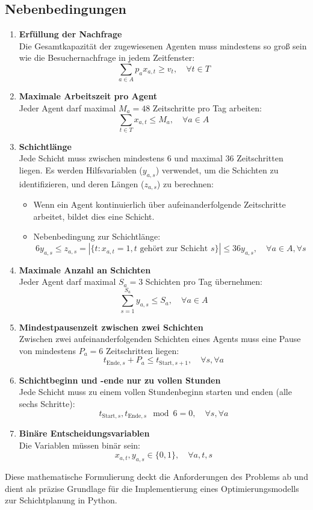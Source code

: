 \subsection*{Nebenbedingungen}
\begin{enumerate}
    \item \textbf{Erfüllung der Nachfrage}\\
          Die Gesamtkapazität der zugewiesenen Agenten muss mindestens so groß sein wie die Besuchernachfrage in jedem Zeitfenster:
          $$\sum_{a \in A} p_a x_{a,t} \geq v_t, \quad \forall t \in T$$
    \item \textbf{Maximale Arbeitszeit pro Agent}\\
          Jeder Agent darf maximal $M_a = 48$ Zeitschritte pro Tag arbeiten:
          $$\sum_{t \in T} x_{a,t} \leq M_a, \quad \forall a \in A$$
    \item \textbf{Schichtlänge}\\
          Jede Schicht muss zwischen mindestens 6 und maximal 36 Zeitschritten liegen. Es werden Hilfsvariablen ($y_{a,s}$) verwendet, um die Schichten zu identifizieren, und deren Längen ($z_{a,s}$) zu berechnen:
          \begin{itemize}
              \item Wenn ein Agent kontinuierlich über aufeinanderfolgende Zeitschritte arbeitet, bildet dies eine Schicht.
              \item Nebenbedingung zur Schichtlänge: $$6y_{a,s} \leq z_{a,s} = |\{t: x_{a,t}=1, t\text{ gehört zur Schicht }s\}| \leq 36y_{a,s},\quad\forall a\in A,\forall s$$
          \end{itemize}
    \item \textbf{Maximale Anzahl an Schichten}\\
          Jeder Agent darf maximal $S_a = 3$ Schichten pro Tag übernehmen:
          $$\sum_{s=1}^{S_a} y_{a,s} \leq S_a,\quad\forall a\in A$$
    \item \textbf{Mindestpausenzeit zwischen zwei Schichten}\\
          Zwischen zwei aufeinanderfolgenden Schichten eines Agents muss eine Pause von mindestens $P_a = 6$ Zeitschritten liegen:
          $$t_{\text{Ende},s} + P_a \leq t_{\text{Start},s+1},\quad\forall s,\forall a$$
    \item \textbf{Schichtbeginn und -ende nur zu vollen Stunden}\\
          Jede Schicht muss zu einem vollen Stundenbeginn starten und enden (alle sechs Schritte):
          $$t_{\text{Start},s}, t_{\text{Ende},s} \mod 6 = 0,\quad\forall s,\forall a$$
    \item \textbf{Binäre Entscheidungsvariablen}\\
          Die Variablen müssen binär sein:
          $$x_{a,t}, y_{a,s} \in \{0,1\},\quad\forall a,t,s$$
\end{enumerate}

Diese mathematische Formulierung deckt die Anforderungen des Problems ab und dient als präzise Grundlage für die Implementierung eines Optimierungsmodells zur Schichtplanung in Python.
